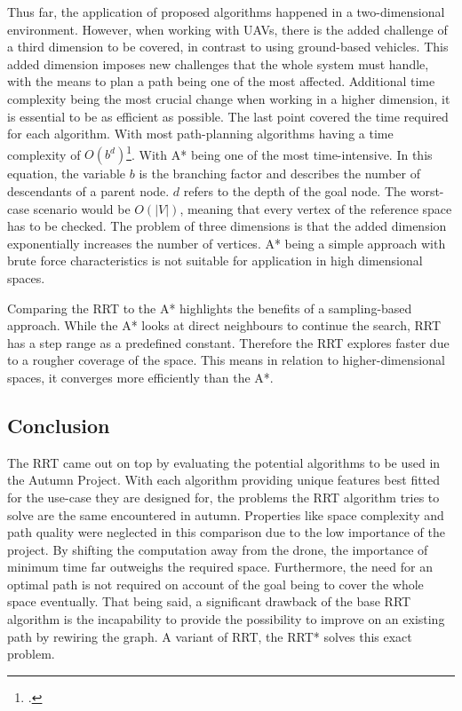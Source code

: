 Thus far, the application of proposed algorithms happened in a two-dimensional environment. However, when working with UAVs, there is the added challenge of a third dimension to be covered, in contrast to using ground-based vehicles. This added dimension imposes new challenges that the whole system must handle, with the means to plan a path being one of the most affected.
Additional time complexity being the most crucial change when working in a higher dimension, it is essential to be as efficient as possible. The last point covered the time required for each algorithm. With most path-planning algorithms having a time complexity of \(O\left(b^d\right)\)\footcite{stackexchangeAstarTimeComplexity2019}. With A* being one of the most time-intensive.
In this equation, the variable $b$ is the branching factor and describes the number of descendants of a parent node. $d$ refers to the depth of the goal node. The worst-case scenario would be \(O\left(|V|\right)\), meaning that every vertex of the reference space has to be checked. The problem of three dimensions is that the added dimension exponentially increases the number of vertices. A* being a simple approach with brute force characteristics is not suitable for application in high dimensional spaces. 

Comparing the RRT to the A* highlights the benefits of a sampling-based approach. While the A* looks at direct neighbours to continue the search, RRT has a step range as a predefined constant. Therefore the RRT explores faster due to a rougher coverage of the space. This means in relation to higher-dimensional spaces, it converges more efficiently than the A*.

\subsection{Conclusion}

The RRT came out on top by evaluating the potential algorithms to be used in the Autumn Project. With each algorithm providing unique features best fitted for the use-case they are designed for, the problems the RRT algorithm tries to solve are the same encountered in autumn. Properties like space complexity and path quality were neglected in this comparison due to the low importance of the project. By shifting the computation away from the drone, the importance of minimum time far outweighs the required space. Furthermore, the need for an optimal path is not required on account of the goal being to cover the whole space eventually. That being said, a significant drawback of the base RRT algorithm is the incapability to provide the possibility to improve on an existing path by rewiring the graph. A variant of RRT, the RRT* solves this exact problem.


